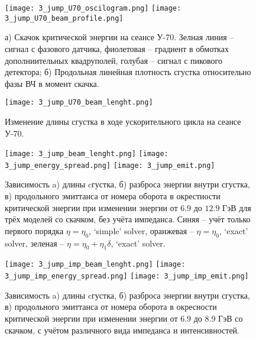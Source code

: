 \begin{figure}
   \texttt{[image: 3\_jump\_U70\_oscilogram.png]}
   \texttt{[image: 3\_jump\_U70\_beam\_profile.png]}
   \caption{а) Скачок критической энергии на сеансе У-70. Зелная линия – сигнал с фазового датчика, фиолетовая – градиент в обмотках дополниительных квадруполей, голубая – сигнал с пикового детектора; б) Продольная линейная плотность сгустка относительно фазы ВЧ в момент скачка.}
   \label{fig:3_jump_U70_oscilogram}
\end{figure}

\begin{figure}
   \centering
   \texttt{[image: 3\_jump\_U70\_beam\_lenght.png]}
   \caption{Изменение длины сгустка в ходе ускорительного цикла на сеансе У-70.}
   \label{fig:3_jump_U70_beam_lenght}
\end{figure}

\begin{figure}
   \texttt{[image: 3\_jump\_beam\_lenght.png]}
   \texttt{[image: 3\_jump\_energy\_spread.png]}
   \texttt{[image: 3\_jump\_emit.png]}
   \caption{Зависимость a) длины cгустка, б) разброса энергии внутри сгустка, в) продольного эмиттанса от номера оборота в окрестности критической энергии при изменении энергии от $6.9$ до $12.9$ ГэВ для трёх моделей со скачком, без учёта импеданса. Синяя – учёт только первого порядка $\eta=\eta_0$, ‘simple’ solver, оранжевая – $\eta=\eta_0$, ‘exact’ solver, зеленая – $\eta=\eta_0+\eta_1\delta$, ‘exact’ solver.}
   \label{fig:3_jump}
\end{figure}

\begin{figure}
   \texttt{[image: 3\_jump\_imp\_beam\_lenght.png]}
   \texttt{[image: 3\_jump\_imp\_energy\_spread.png]}
   \texttt{[image: 3\_jump\_imp\_emit.png]}
   \caption{Зависимость a) длины cгустка, б) разброса энергии внутри сгустка, в) продольного эмиттанса от номера оборота в окресности критической энергии при изменении энергии от $6.9$ до $8.9$ ГэВ со скачком, с учётом различного вида импеданса и интенсивностей.}
   \label{fig:3_jump_imp}
\end{figure}

